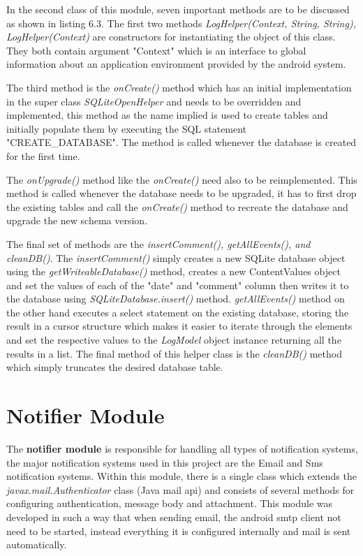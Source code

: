 In the second class of this module, seven important methods are to be discussed as shown in listing 6.3. 
The first two methods {\it LogHelper(Context, String, String), LogHelper(Context)} are constructors for instantiating the object of this class. They both contain argument "Context" which is an interface to global information about an application environment provided by the android system. 

The third method is the {\it onCreate()} method which has an initial implementation in the super class {\it SQLiteOpenHelper} and needs to be overridden and implemented, this method as the name implied is used to create tables and initially populate them by executing the SQL statement "CREATE\_DATABASE". The method is called whenever the database is created for the first time.

The {\it onUpgrade()} method like the {\it onCreate()} need also to be reimplemented. This method is called whenever the database needs to be upgraded, it has to first drop the existing tables and call the {\it onCreate()} method to recreate the database and upgrade the new schema version.  

The final set of methods are the {\it insertComment(), getAllEvents(), and cleanDB()}. The {\it insertComment()} simply creates a new SQLite database object using the {\it getWriteableDatabase()} method, creates a new ContentValues object and set the values of each of the "date" and "comment" column then writes it to the database using {\it SQLiteDatabase.insert()} method.
{\it  getAllEvents()} method on the other hand executes a select statement on the existing database, storing the result in a cursor structure which makes it easier to iterate through the elements and set the respective values to the {\it LogModel} object instance returning all the results in a list. The final method of this helper class is the {\it cleanDB()} method which simply truncates the desired database table. 

\section{Notifier Module}
The {\bf notifier module} is responsible for handling all types of notification systems, the major notification systems used in this project are the Email and Sms notification systems. Within this module, there is a single class which extends the {\it javax.mail.Authenticator} class (Java mail api) and consists of several methods for configuring authentication, message body and attachment. This module was developed in such a way that when sending email, the android smtp client not need to be started, instead everything it is configured internally and mail is sent automatically. 

